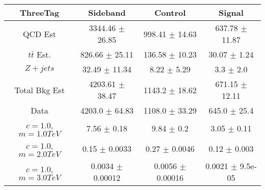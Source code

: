 \begin{footnotesize} 
\begin{tabular}{c|c|c|c} 
ThreeTag & Sideband & Control & Signal \\ 
\hline\hline 
QCD Est & 3344.46 $\pm$ 26.85 & 998.41 $\pm$ 14.63 & 637.78 $\pm$ 11.87\\ 
$t\bar{t}$ Est.  & 826.66 $\pm$ 25.11 & 136.58 $\pm$ 10.23 & 30.07 $\pm$ 1.24\\ 
$Z+jets$ & 32.49 $\pm$ 11.34 & 8.22 $\pm$ 5.29 & 3.3 $\pm$ 2.0\\ 
Total Bkg Est & 4203.61 $\pm$ 38.47 & 1143.2 $\pm$ 18.62 & 671.15 $\pm$ 12.11\\ 
Data & 4203.0 $\pm$ 64.83 & 1108.0 $\pm$ 33.29 & 645.0 $\pm$ 25.4\\ 
$c=1.0$,$m=1.0TeV$ & 7.56 $\pm$ 0.18 & 9.84 $\pm$ 0.2 & 3.05 $\pm$ 0.11\\ 
$c=1.0$,$m=2.0TeV$ & 0.15 $\pm$ 0.0033 & 0.27 $\pm$ 0.0046 & 0.12 $\pm$ 0.003\\ 
$c=1.0$,$m=3.0TeV$ & 0.0034 $\pm$ 0.00012 & 0.0056 $\pm$ 0.00016 & 0.0021 $\pm$ 9.5e-05\\ 
\hline\hline 
\end{tabular} 
\end{footnotesize} 
\newline 
